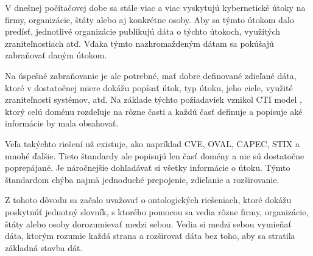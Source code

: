\documentclass[12pt, a4paper, oneside]{book}
\begin{document}
V dnešnej počítačovej dobe sa stále viac a viac vyskytujú kybernetické útoky na firmy, organizácie, štáty alebo aj konkrétne osoby. Aby sa týmto útokom dalo predísť, jednotlivé organizácie publikujú dáta o týchto útokoch, využitých zraniteľnostiach atď. Vďaka týmto nazhromaždeným dátam sa pokúšajú zabraňovať daným útokom. 


Na úspešné zabraňovanie je ale potrebné, mať dobre definované zdieľané dáta, ktoré v dostatočnej miere dokážu popísať útok, typ útoku, jeho ciele, využité zraniteľnosti systémov, atď. Na základe týchto požiadaviek vznikol CTI model \citep{MavroeidisB17}, ktorý celú doménu rozdeľuje na rôzne časti a každú časť definuje a popisuje aké informácie by mala obsahovať. 


Veľa takýchto riešení už existuje, ako napríklad CVE\citep{cve}, OVAL\citep{oval}, CAPEC\citep{capec}, STIX\citep{stix} a mnohé ďalšie. Tieto štandardy ale popisujú len časť domény a nie sú dostatočne poprepájané. Je náročnejšie dohľadávať si všetky informácie o útoku. Týmto štandardom chýba najmä jednoduché prepojenie, zdieľanie a rozširovanie.



Z tohoto dôvodu sa začalo uvažovať o ontologických riešeniach, ktoré dokážu poskytnúť jednotný slovník, s ktorého pomocou sa vedia rôzne firmy, organizácie, štáty alebo osoby dorozumievať medzi sebou. Vedia si medzi sebou vymieňať dáta, ktorým rozumie každá strana a rozširovať dáta bez toho, aby sa stratila základná stavba dát.
\end{document}
